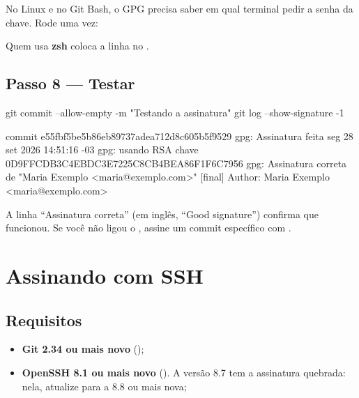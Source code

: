 No Linux e no Git Bash, o GPG precisa saber em qual terminal pedir a senha da chave. Rode uma vez:


Quem usa \textbf{zsh} coloca a linha  no .

\subsection{Passo 8 — Testar}

\begin{bashcode}
git commit --allow-empty -m "Testando a assinatura"
git log --show-signature -1
\end{bashcode}
\begin{saida}
commit e55fbf5be5b86eb89737adea712d8c605b5f9529
gpg: Assinatura feita seg 28 set 2026 14:51:16 -03
gpg:                usando RSA chave 0D9FFCDB3C4EBDC3E7225C8CB4BEA86F1F6C7956
gpg: Assinatura correta de "Maria Exemplo <maria@exemplo.com>" [final]
Author: Maria Exemplo <maria@exemplo.com>
\end{saida}

A linha \enquote{Assinatura correta} (em inglês, \enquote{Good signature}) confirma que funcionou. Se você não ligou o , assine um commit específico com .

\section{Assinando com SSH}

\subsection{Requisitos}

\begin{itemize}
  \item \textbf{Git 2.34 ou mais novo} ();
  \item \textbf{OpenSSH 8.1 ou mais novo} (). A versão 8.7 tem a assinatura quebrada: nela, atualize para a 8.8 ou mais nova;
\end{itemize}


